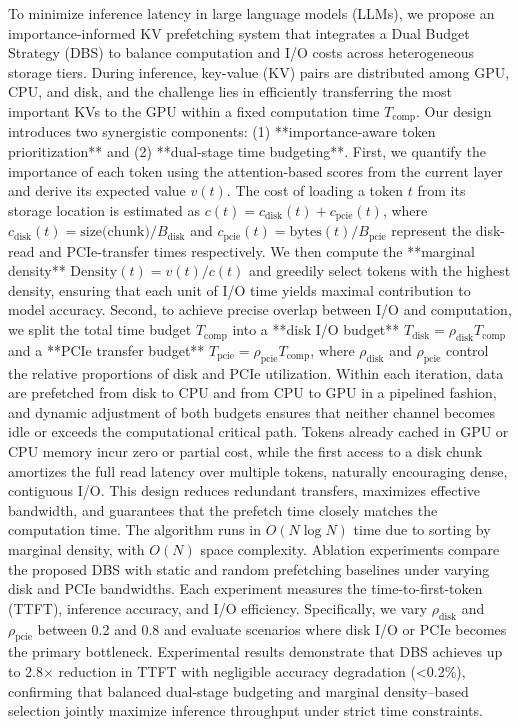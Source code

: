{
	To minimize inference latency in large language models (LLMs), we propose an importance-informed KV prefetching system that integrates a Dual Budget Strategy (DBS) to balance computation and I/O costs across heterogeneous storage tiers. During inference, key-value (KV) pairs are distributed among GPU, CPU, and disk, and the challenge lies in efficiently transferring the most important KVs to the GPU within a fixed computation time $T_{\text{comp}}$. Our design introduces two synergistic components: (1) **importance-aware token prioritization** and (2) **dual-stage time budgeting**. First, we quantify the importance of each token using the attention-based scores from the current layer and derive its expected value $v(t)$. The cost of loading a token $t$ from its storage location is estimated as $c(t) = c_{\text{disk}}(t) + c_{\text{pcie}}(t)$, where $c_{\text{disk}}(t) = \text{size(chunk)}/B_{\text{disk}}$ and $c_{\text{pcie}}(t) = \text{bytes}(t)/B_{\text{pcie}}$ represent the disk-read and PCIe-transfer times respectively. We then compute the **marginal density** $\text{Density}(t) = v(t)/c(t)$ and greedily select tokens with the highest density, ensuring that each unit of I/O time yields maximal contribution to model accuracy. Second, to achieve precise overlap between I/O and computation, we split the total time budget $T_{\text{comp}}$ into a **disk I/O budget** $T_{\text{disk}} = \rho_{\text{disk}}T_{\text{comp}}$ and a **PCIe transfer budget** $T_{\text{pcie}} = \rho_{\text{pcie}}T_{\text{comp}}$, where $\rho_{\text{disk}}$ and $\rho_{\text{pcie}}$ control the relative proportions of disk and PCIe utilization. Within each iteration, data are prefetched from disk to CPU and from CPU to GPU in a pipelined fashion, and dynamic adjustment of both budgets ensures that neither channel becomes idle or exceeds the computational critical path. Tokens already cached in GPU or CPU memory incur zero or partial cost, while the first access to a disk chunk amortizes the full read latency over multiple tokens, naturally encouraging dense, contiguous I/O. This design reduces redundant transfers, maximizes effective bandwidth, and guarantees that the prefetch time closely matches the computation time. The algorithm runs in $O(N\log N)$ time due to sorting by marginal density, with $O(N)$ space complexity. Ablation experiments compare the proposed DBS with static and random prefetching baselines under varying disk and PCIe bandwidths. Each experiment measures the time-to-first-token (TTFT), inference accuracy, and I/O efficiency. Specifically, we vary $\rho_{\text{disk}}$ and $\rho_{\text{pcie}}$ between 0.2 and 0.8 and evaluate scenarios where disk I/O or PCIe becomes the primary bottleneck. Experimental results demonstrate that DBS achieves up to 2.8× reduction in TTFT with negligible accuracy degradation (<0.2\%), confirming that balanced dual-stage budgeting and marginal density–based selection jointly maximize inference throughput under strict time constraints.
}
